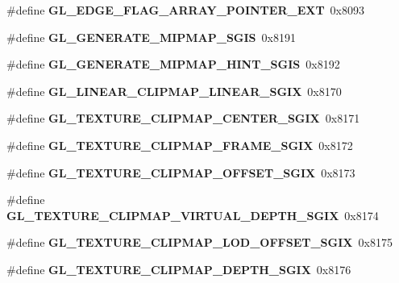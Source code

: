 \begin{DoxyCompactItemize}
\item 
\#define {\bfseries G\+L\+\_\+\+E\+D\+G\+E\+\_\+\+F\+L\+A\+G\+\_\+\+A\+R\+R\+A\+Y\+\_\+\+P\+O\+I\+N\+T\+E\+R\+\_\+\+E\+X\+T}~0x8093\label{_s_d_l__opengl_8h_ae1652570bf70bb83d37cb8559eb680dd}

\item 
\#define {\bfseries G\+L\+\_\+\+G\+E\+N\+E\+R\+A\+T\+E\+\_\+\+M\+I\+P\+M\+A\+P\+\_\+\+S\+G\+I\+S}~0x8191\label{_s_d_l__opengl_8h_a88a81c788f81e0325a66e8294aa59a4e}

\item 
\#define {\bfseries G\+L\+\_\+\+G\+E\+N\+E\+R\+A\+T\+E\+\_\+\+M\+I\+P\+M\+A\+P\+\_\+\+H\+I\+N\+T\+\_\+\+S\+G\+I\+S}~0x8192\label{_s_d_l__opengl_8h_aacb38307723117d051220be785bbcd79}

\item 
\#define {\bfseries G\+L\+\_\+\+L\+I\+N\+E\+A\+R\+\_\+\+C\+L\+I\+P\+M\+A\+P\+\_\+\+L\+I\+N\+E\+A\+R\+\_\+\+S\+G\+I\+X}~0x8170\label{_s_d_l__opengl_8h_a28d7d458df31c82f1b1f5cb64e3e5aa6}

\item 
\#define {\bfseries G\+L\+\_\+\+T\+E\+X\+T\+U\+R\+E\+\_\+\+C\+L\+I\+P\+M\+A\+P\+\_\+\+C\+E\+N\+T\+E\+R\+\_\+\+S\+G\+I\+X}~0x8171\label{_s_d_l__opengl_8h_a7a42ed219e547e1c7d413fa79e6c57b6}

\item 
\#define {\bfseries G\+L\+\_\+\+T\+E\+X\+T\+U\+R\+E\+\_\+\+C\+L\+I\+P\+M\+A\+P\+\_\+\+F\+R\+A\+M\+E\+\_\+\+S\+G\+I\+X}~0x8172\label{_s_d_l__opengl_8h_a726ab65dc21404f7b54eac404ab91877}

\item 
\#define {\bfseries G\+L\+\_\+\+T\+E\+X\+T\+U\+R\+E\+\_\+\+C\+L\+I\+P\+M\+A\+P\+\_\+\+O\+F\+F\+S\+E\+T\+\_\+\+S\+G\+I\+X}~0x8173\label{_s_d_l__opengl_8h_a446e23d55c4eef6198c4c2da2502b3ec}

\item 
\#define {\bfseries G\+L\+\_\+\+T\+E\+X\+T\+U\+R\+E\+\_\+\+C\+L\+I\+P\+M\+A\+P\+\_\+\+V\+I\+R\+T\+U\+A\+L\+\_\+\+D\+E\+P\+T\+H\+\_\+\+S\+G\+I\+X}~0x8174\label{_s_d_l__opengl_8h_a1d035f11393bb4572dc8dcbf613e25f9}

\item 
\#define {\bfseries G\+L\+\_\+\+T\+E\+X\+T\+U\+R\+E\+\_\+\+C\+L\+I\+P\+M\+A\+P\+\_\+\+L\+O\+D\+\_\+\+O\+F\+F\+S\+E\+T\+\_\+\+S\+G\+I\+X}~0x8175\label{_s_d_l__opengl_8h_add981206c10f7da21c6a71d9648ea993}

\item 
\#define {\bfseries G\+L\+\_\+\+T\+E\+X\+T\+U\+R\+E\+\_\+\+C\+L\+I\+P\+M\+A\+P\+\_\+\+D\+E\+P\+T\+H\+\_\+\+S\+G\+I\+X}~0x8176\label{_s_d_l__opengl_8h_a19dc5f6553de8fb960660340122e4d53}


\end{DoxyCompactItemize}
